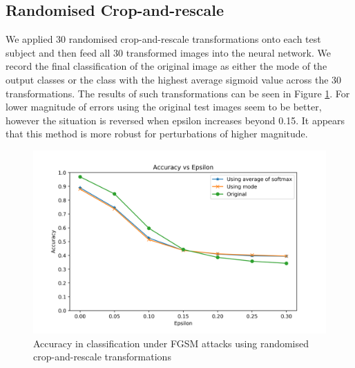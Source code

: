 \subsection{Randomised Crop-and-rescale}

We applied 30 randomised crop-and-rescale transformations onto each test subject and then feed all 30 transformed images into the neural network. We record the final classification of the original image as either the mode of the output classes or the class with the highest average sigmoid value across the 30 transformations. The results of such transformations can be seen in Figure \ref{fig:rand}. For lower magnitude of errors using the original test images seem to be better, however the situation is reversed when epsilon increases beyond 0.15. It appears that this method is more robust for perturbations of higher magnitude.

\begin{figure}[h!]
        \includegraphics[width=\textwidth]{sgd_random}
		\caption{Accuracy in classification under FGSM attacks using randomised crop-and-rescale transformations}
		\label{fig:rand}
\end{figure}

